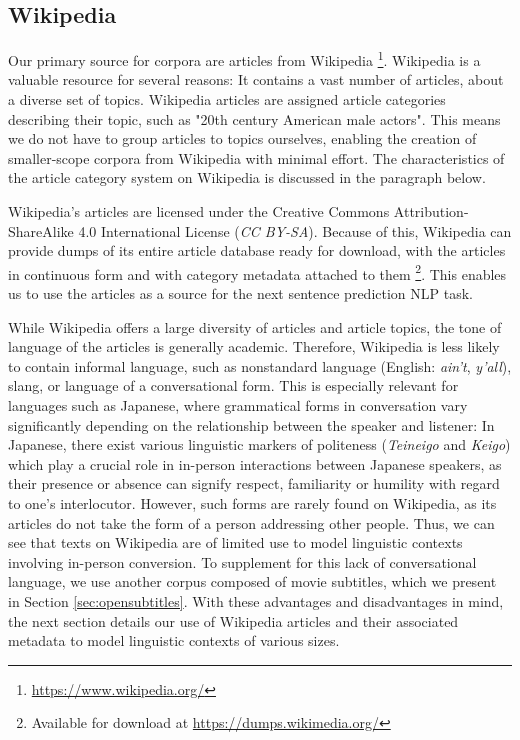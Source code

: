 \subsection{Wikipedia} \label{sec:wikipedia}
Our primary source for corpora are articles from Wikipedia \footnote{\url{https://www.wikipedia.org/}}.
Wikipedia is a valuable resource for several reasons:
It contains a vast number of articles, about a diverse set of topics.
Wikipedia articles are assigned article categories describing their topic, such as "20th century American male actors".
This means we do not have to group articles to topics ourselves, enabling the creation of smaller-scope corpora from Wikipedia with minimal effort.
The characteristics of the article category system on Wikipedia is discussed in the paragraph below.

Wikipedia's articles are licensed under the Creative Commons Attribution-ShareAlike 4.0 International License (\textit{CC BY-SA}).
Because of this, Wikipedia can provide dumps of its entire article database ready for download, with the articles in continuous form and with category metadata attached to them \footnote{Available for download at \url{https://dumps.wikimedia.org/}}.
This enables us to use the articles as a source for the next sentence prediction NLP task.

While Wikipedia offers a large diversity of articles and article topics, the tone of language of the articles is generally academic.
Therefore, Wikipedia is less likely to contain informal language, such as nonstandard language (English: \textit{ain't}, \textit{y'all}), slang, or language of a conversational form.
This is especially relevant for languages such as Japanese, where grammatical forms in conversation vary significantly depending on the relationship between the speaker and listener:
In Japanese, there exist various linguistic markers of politeness (\textit{Teineigo} and \textit{Keigo}) which play a crucial role in in-person interactions between Japanese speakers, as their presence or absence can signify respect, familiarity or humility with regard to one's interlocutor.
However, such forms are rarely found on Wikipedia, as its articles do not take the form of a person addressing other people.
Thus, we can see that texts on Wikipedia are of limited use to model linguistic contexts involving in-person conversion.
To supplement for this lack of conversational language, we use another corpus composed of movie subtitles, which we present in Section \ref{sec:opensubtitles}.
With these advantages and disadvantages in mind, the next section details our use of Wikipedia articles and their associated metadata to model linguistic contexts of various sizes.

